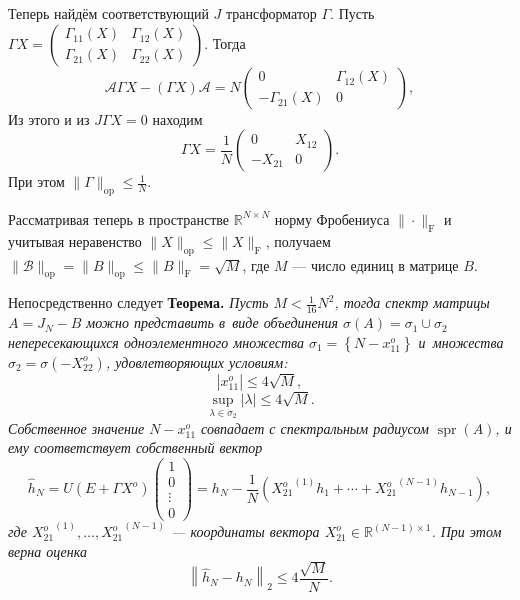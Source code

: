 \documentclass[12pt]{article}
\begin{document}
Теперь найдём соответствующий \( J \)
    трансформатор \( \Gamma \).
Пусть \( \Gamma X = \begin{pmatrix}
    \Gamma_{11}(X) & \Gamma_{12}(X) \\
    \Gamma_{21}(X) & \Gamma_{22}(X)
\end{pmatrix} \).
Тогда
\[
    \mathcal{A} \Gamma X - (\Gamma X)\mathcal{A} =
    N
    \begin{pmatrix}
        0 & \Gamma_{12}(X) \\
        -\Gamma_{21}(X) & 0
     \end{pmatrix},
     \]
Из этого и из \( J\Gamma X = 0 \) находим
    \[
        \Gamma X = \frac{1}{N} \begin{pmatrix} 0 & X_{12} \\ -X_{21} & 0 \end{pmatrix}.
        \]
При этом
    \(
        \|\Gamma\|_{\mathrm{op}} \leq \frac1N.
        \)

Рассматривая теперь в пространстве \( \mathbb{R}^{N{\times}N} \)
    норму Фробениуса \( \|\cdot\|_{\mathrm{F}} \)
    и учитывая неравенство \( \|X\|_{\mathrm{op}} \leq \|X\|_{\mathrm{F}} \),
    получаем \( \|\mathcal{B}\|_{\mathrm{op}} =
        \|B\|_{\mathrm{op}} \leq \|B\|_{\mathrm{F}} = \sqrt{M} \),
    где \( M \) --- число единиц в матрице \( B \).

Непосредственно следует
\begingroup
\textbf{Теорема.}\itshape\label{kozlukovsv:thm:almost-all-ones}
    Пусть \( M < \frac{1}{16}N^2 \),
        тогда спектр матрицы \( A = J_N{-}B \) можно представить в~виде
        объединения \( \sigma\left(A\right) = \sigma_1 \cup \sigma_2 \)
        непересекающихся
        одноэлементного множества \( {\sigma_1 = \left\{ N{-}x_{11}^o \right\}} \)
        и~множества \( \sigma_2=\sigma(-X_{22}^o) \), удовлетворяющих условиям:
    \[
        |x_{11}^o| \leq 4\sqrt{M},
        \]
    \[
        \sup_{\lambda\in\sigma_2} |\lambda| \leq 4\sqrt{M}.
        \]
    Собственное значение \( N - x_{11}^o \) совпадает с спектральным радиусом
        \( \operatorname{spr}(A) \),
        и ему соответствует собственный вектор
        \[
            \hat{h}_N =
            U(E+\Gamma X^o)\begin{pmatrix}1\\0\\ {\vdots}\\ 0\end{pmatrix} =
            h_N -
            \frac1N (
                {X_{21}^o}^{(1)} h_1 +
                \cdots +
                {X_{21}^o}^{(N-1)} h_{N-1}),
            \]
        где \( {X_{21}^o}^{(1)}, \ldots, {X_{21}^o}^{(N-1)} \)
        --- координаты вектора \( X_{21}^o\in\mathbb{R}^{(N{-}1){\times}1} \).
    При этом верна оценка
    \[
        \left\|\hat{h}_N - h_N \right\|_2 \leq 4\frac{\sqrt{M}}{N}.
        \]
\endgroup
\end{document}
